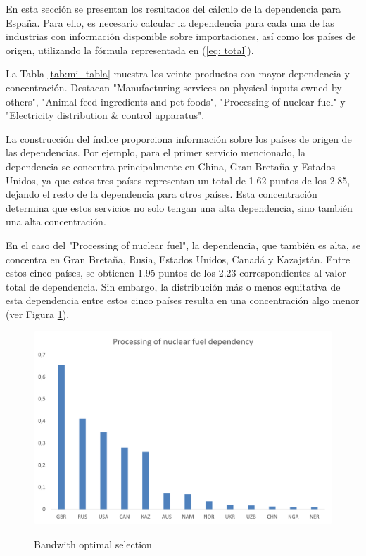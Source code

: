 \documentclass[5p,authoryear]{elsarticle}
\begin{document}
En esta sección se presentan los resultados del cálculo de la dependencia para España. Para ello, es necesario calcular la dependencia para cada una de las industrias con información disponible sobre importaciones, así como los países de origen, utilizando la fórmula representada en (\ref{eq: total}).

La Tabla \ref{tab:mi_tabla} muestra los veinte productos con mayor dependencia y concentración. Destacan "Manufacturing services on physical inputs owned by others", "Animal feed ingredients and pet foods", "Processing of nuclear fuel" y "Electricity distribution & control apparatus".

La construcción del índice proporciona información sobre los países de origen de las dependencias. Por ejemplo, para el primer servicio mencionado, la dependencia se concentra principalmente en China, Gran Bretaña y Estados Unidos, ya que estos tres países representan un total de 1.62 puntos de los 2.85, dejando el resto de la dependencia para otros países. Esta concentración determina que estos servicios no solo tengan una alta dependencia, sino también una alta concentración.

En el caso del "Processing of nuclear fuel", la dependencia, que también es alta, se concentra en Gran Bretaña, Rusia, Estados Unidos, Canadá y Kazajstán. Entre estos cinco países, se obtienen 1.95 puntos de los 2.23 correspondientes al valor total de dependencia. Sin embargo, la distribución más o menos equitativa de esta dependencia entre estos cinco países resulta en una concentración algo menor (ver Figura \ref{fig:fig1}).


\begin{figure}[t] %
    \centering
    \caption{Bandwith optimal selection}
    \includegraphics[width=0.7\linewidth]{../Imagenes/Nuclear fig.png}
    \label{fig:fig1}
\end{figure}
\end{document}
